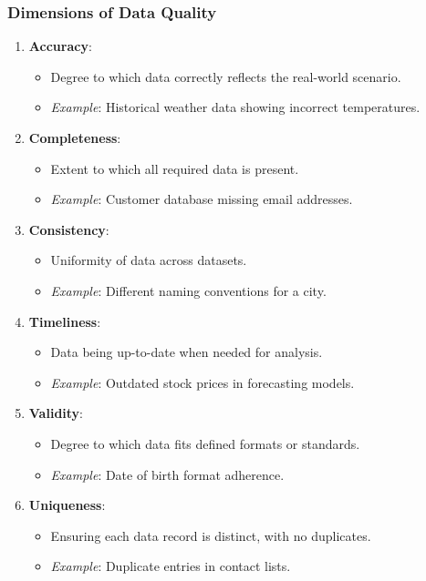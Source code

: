 \documentclass[aspectratio=169]{beamer}
\begin{document}
\begin{frame}[fragile]
    \frametitle{Dimensions of Data Quality}
    \begin{enumerate}
        \item \textbf{Accuracy}:
            \begin{itemize}
                \item Degree to which data correctly reflects the real-world scenario.
                \item \textit{Example}: Historical weather data showing incorrect temperatures.
            \end{itemize}
        \item \textbf{Completeness}:
            \begin{itemize}
                \item Extent to which all required data is present.
                \item \textit{Example}: Customer database missing email addresses.
            \end{itemize}
        \item \textbf{Consistency}:
            \begin{itemize}
                \item Uniformity of data across datasets.
                \item \textit{Example}: Different naming conventions for a city.
            \end{itemize}
        \item \textbf{Timeliness}:
            \begin{itemize}
                \item Data being up-to-date when needed for analysis.
                \item \textit{Example}: Outdated stock prices in forecasting models.
            \end{itemize}
        \item \textbf{Validity}:
            \begin{itemize}
                \item Degree to which data fits defined formats or standards.
                \item \textit{Example}: Date of birth format adherence.
            \end{itemize}
        \item \textbf{Uniqueness}:
            \begin{itemize}
                \item Ensuring each data record is distinct, with no duplicates.
                \item \textit{Example}: Duplicate entries in contact lists.
            \end{itemize}
    \end{enumerate}
\end{frame}
\end{document}
